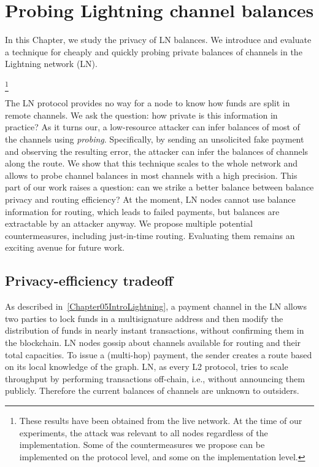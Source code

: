 \chapter{Probing Lightning channel balances}

\label{Chapter06LNprobing}

In this Chapter, we study the privacy of LN balances.
We introduce and evaluate a technique for cheaply and quickly probing private balances of channels in the Lightning network (LN).


\footnote{These results have been obtained from the live network. At the time of our experiments, the attack was relevant to all nodes regardless of the implementation. Some of the countermeasures we propose can be implemented on the protocol level, and some on the implementation level.}

The LN protocol provides no way for a node to know how funds are split in remote channels.
We ask the question: how private is this information in practice?
As it turns our, a low-resource attacker can infer balances of most of the channels using \textit{probing}.
Specifically, by sending an unsolicited fake payment and observing the resulting error, the attacker can infer the balances of channels along the route.
We show that this technique scales to the whole network and allows to probe channel balances in most channels with a high precision.
This part of our work raises a question: can we strike a better balance between balance privacy and routing efficiency?
At the moment, LN nodes cannot use balance information for routing, which leads to failed payments, but balances are extractable by an attacker anyway.
We propose multiple potential countermeasures, including just-in-time routing.
Evaluating them remains an exciting avenue for future work.

\section{Privacy-efficiency tradeoff}

As described in~\ref{Chapter05IntroLightning}, a payment channel in the LN allows two parties to lock funds in a multisignature address and then modify the distribution of funds in nearly instant transactions, without confirming them in the blockchain.
LN nodes gossip about channels available for routing and their total capacities.
To issue a (multi-hop) payment, the sender creates a route based on its local knowledge of the graph.
LN, as every L2 protocol, tries to scale throughput by performing transactions off-chain, i.e., without announcing them publicly.
Therefore the current balances of channels are unknown to outsiders.

